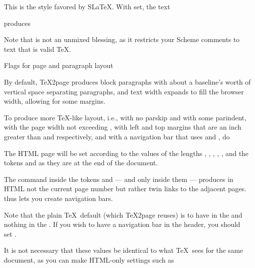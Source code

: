 
\n This is the style favored by S\LaTeX.
\ifx\shipout\UnDeFiNeD
With \p{\TZPslatexcomments} set, the text


\n produces
\let\TZPslatexcomments 1

\let\TZPslatexcomments 0

\fi
Note that \p{\TZPslatexcomments=1} is not an unmixed blessing, as it
restricts your Scheme comments to text that is valid \TeX.

\beginsection Flags for page and paragraph layout

%
By default, \TeX2page produces block paragraphs with about a
baseline's worth of vertical space separating paragraphs, and text width
expands to fill the browser width, allowing for some margins.

To produce more \TeX-like layout, i.e., with no parskip and
with some parindent,
with the page width not exceeding \p{\hsize},
with left and top margins that are an inch greater than
\p{\hoffset} and \p{\voffset} respectively, and with a
navigation bar that uses \p{\headline} and \p{\footline},
do


%
The HTML page will be set according to the values of the
lengths \p{\hsize}, \p{\hoffset}, \p{\voffset},
\p{\parskip}, \p{\parindent}, and the tokens \p{\headline}
and \p{\footline} as they are at the end of
the document.

The command \p{\folio} inside the tokens \p{\headline} and \p{\footline}
--- and only inside them ---
produces in HTML not the current page number but rather twin links to the
adjacent pages. \p{\folio} thus lets you create navigation
bars.

Note that the plain \TeX\ default (which
\TeX2page reuses) is to have \p{\folio} in the
\p{\footline} and nothing in the \p{\headline}.  If you wish
to have a navigation bar in the header, you should set
\p{\headline}.

It is not necessary that these values be
identical to what \TeX\ sees for the same document, as you can
make HTML-only settings such as

